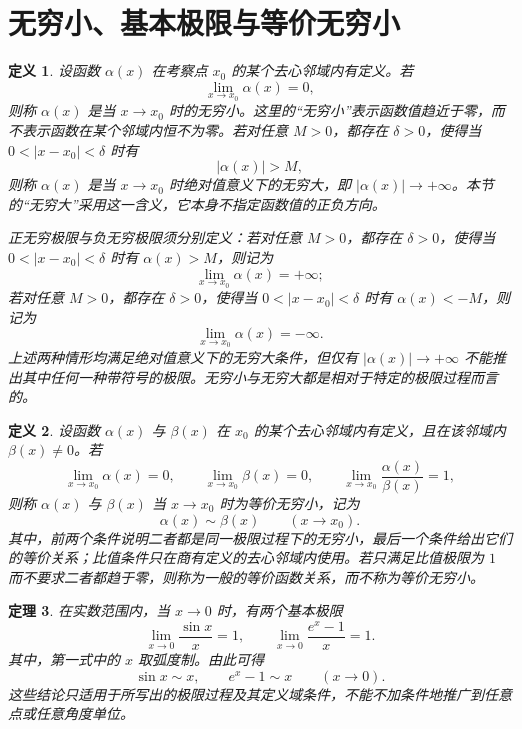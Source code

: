 \documentclass[UTF8,fontset=fandol,11pt]{ctexart}
\newtheorem{definition}{定义}[section]
\newtheorem{theorem}[definition]{定理}
\begin{document}
\section{无穷小、基本极限与等价无穷小}\label{sec:S03}
\begin{definition}
设函数 $\alpha(x)$ 在考察点 $x_0$ 的某个去心邻域内有定义。若
\[
\lim_{x\to x_0}\alpha(x)=0,
\]
则称 $\alpha(x)$ 是当 $x\to x_0$ 时的无穷小。这里的“无穷小”表示函数值趋近于零，而不表示函数在某个邻域内恒不为零。若对任意 $M>0$，都存在 $\delta>0$，使得当 $0<|x-x_0|<\delta$ 时有
\[
|\alpha(x)|>M,
\]
则称 $\alpha(x)$ 是当 $x\to x_0$ 时绝对值意义下的无穷大，即 $|\alpha(x)|\to+\infty$。本节的“无穷大”采用这一含义，它本身不指定函数值的正负方向。

正无穷极限与负无穷极限须分别定义：若对任意 $M>0$，都存在 $\delta>0$，使得当 $0<|x-x_0|<\delta$ 时有 $\alpha(x)>M$，则记为
\[
\lim_{x\to x_0}\alpha(x)=+\infty;
\]
若对任意 $M>0$，都存在 $\delta>0$，使得当 $0<|x-x_0|<\delta$ 时有 $\alpha(x)<-M$，则记为
\[
\lim_{x\to x_0}\alpha(x)=-\infty.
\]
上述两种情形均满足绝对值意义下的无穷大条件，但仅有 $|\alpha(x)|\to+\infty$ 不能推出其中任何一种带符号的极限。无穷小与无穷大都是相对于特定的极限过程而言的。\label{def:infinitesimal}
\end{definition}
\begin{definition}
设函数 $\alpha(x)$ 与 $\beta(x)$ 在 $x_0$ 的某个去心邻域内有定义，且在该邻域内 $\beta(x)\neq0$。若
\[
\lim_{x\to x_0}\alpha(x)=0,\qquad
\lim_{x\to x_0}\beta(x)=0,
\qquad
\lim_{x\to x_0}\frac{\alpha(x)}{\beta(x)}=1,
\]
则称 $\alpha(x)$ 与 $\beta(x)$ 当 $x\to x_0$ 时为等价无穷小，记为
\[
\alpha(x)\sim\beta(x)\qquad(x\to x_0).
\]
其中，前两个条件说明二者都是同一极限过程下的无穷小，最后一个条件给出它们的等价关系；比值条件只在商有定义的去心邻域内使用。若只满足比值极限为 $1$ 而不要求二者都趋于零，则称为一般的等价函数关系，而不称为等价无穷小。\label{def:equivalent-infinitesimal}
\end{definition}
\begin{theorem}
在实数范围内，当 $x\to0$ 时，有两个基本极限
\[
\lim_{x\to0}\frac{\sin x}{x}=1,
\qquad
\lim_{x\to0}\frac{e^x-1}{x}=1.
\]
其中，第一式中的 $x$ 取弧度制。由此可得
\[
\sin x\sim x,
\qquad
 e^x-1\sim x\qquad(x\to0).
\]
这些结论只适用于所写出的极限过程及其定义域条件，不能不加条件地推广到任意点或任意角度单位。\label{thm:fundamental-limits}
\end{theorem}
\end{document}
